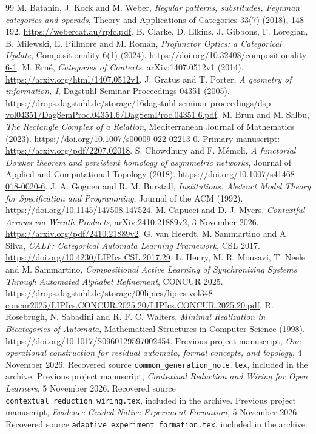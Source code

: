 \begin{thebibliography}{99}
 M. Batanin, J. Kock and M. Weber,
\emph{Regular patterns, substitudes, Feynman categories and operads},
Theory and Applications of Categories 33(7) (2018), 148--192.
\url{https://webercat.au/rpfc.pdf}.
 B. Clarke, D. Elkins, J. Gibbons, F. Loregian,
B. Milewski, E. Pillmore and M. Rom\'an,
\emph{Profunctor Optics: a Categorical Update}, Compositionality 6(1) (2024).
\url{https://doi.org/10.32408/compositionality-6-1}.
 M. Ern\'e, \emph{Categories of Contexts},
arXiv:1407.0512v1 (2014).
\url{https://arxiv.org/html/1407.0512v1}.
 J. Gratus and T. Porter, \emph{A geometry of information, I},
Dagstuhl Seminar Proceedings 04351 (2005).
\url{https://drops.dagstuhl.de/storage/16dagstuhl-seminar-proceedings/dsp-vol04351/DagSemProc.04351.6/DagSemProc.04351.6.pdf}.
 M. Brun and M. Salbu, \emph{The Rectangle Complex of a Relation},
Mediterranean Journal of Mathematics (2023).
\url{https://doi.org/10.1007/s00009-022-02213-0}.
Primary manuscript: \url{https://arxiv.org/pdf/2207.02018}.
 S. Chowdhury and F. M\'emoli,
\emph{A functorial Dowker theorem and persistent homology of asymmetric networks},
Journal of Applied and Computational Topology (2018).
\url{https://doi.org/10.1007/s41468-018-0020-6}.
 J. A. Goguen and R. M. Burstall,
\emph{Institutions: Abstract Model Theory for Specification and Programming},
Journal of the ACM (1992).
\url{https://doi.org/10.1145/147508.147524}.
 M. Capucci and D. J. Myers,
\emph{Contextful Arrows via Wreath Products}, arXiv:2410.21889v2,
3 November 2026.
\url{https://arxiv.org/pdf/2410.21889v2}.
 G. van Heerdt, M. Sammartino and A. Silva,
\emph{CALF: Categorical Automata Learning Framework}, CSL 2017.
\url{https://doi.org/10.4230/LIPIcs.CSL.2017.29}.
 L. Henry, M. R. Mousavi, T. Neele and M. Sammartino,
\emph{Compositional Active Learning of Synchronizing Systems Through
Automated Alphabet Refinement}, CONCUR 2025.
\url{https://drops.dagstuhl.de/storage/00lipics/lipics-vol348-concur2025/LIPIcs.CONCUR.2025.20/LIPIcs.CONCUR.2025.20.pdf}.
 R. Rosebrugh, N. Sabadini and R. F. C. Walters,
\emph{Minimal Realization in Bicategories of Automata},
Mathematical Structures in Computer Science (1998).
\url{https://doi.org/10.1017/S0960129597002454}.
 Previous project manuscript,
\emph{One operational construction for residual automata, formal concepts,
and topology}, 4 November 2026.
Recovered source \texttt{common\_generation\_note.tex}, included in the archive.
 Previous project manuscript,
\emph{Contextual Reduction and Wiring for Open Learners}, 5 November 2026.
Recovered source \texttt{contextual\_reduction\_wiring.tex}, included in the archive.
 Previous project manuscript,
\emph{Evidence Guided Native Experiment Formation}, 5 November 2026.
Recovered source \texttt{adaptive\_experiment\_formation.tex}, included in the archive.
\end{thebibliography}

